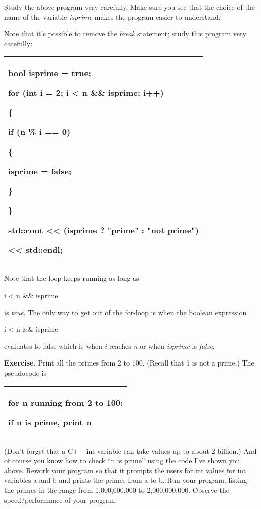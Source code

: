 \documentclass[
]{article}
\begin{document}
Study the above program very carefully. Make sure you see that the
choice of the name of the variable \emph{isprime} makes the program
easier to understand.

Note that it's possible to remove the \emph{break} statement; study this
program very carefully:

\begin{longtable}[]{@{}l@{}}
\toprule
\endhead
\begin{minipage}[t]{0.97\columnwidth}\raggedright
bool isprime = true;

for (int i = 2; i \textless{} n \&\& isprime; i++)

\{

if (n \% i == 0)

\{

isprime = false;

\}

\}

std::cout \textless\textless{} (isprime ? "prime" : "not prime")

\textless\textless{} std::endl;\strut
\end{minipage}\tabularnewline
\bottomrule
\end{longtable}

Note that the loop keeps running as long as

i \textless{} n \&\& isprime

is \emph{true}. The only way to get out of the for-loop is when the
boolean expression

i \textless{} n \&\& isprime

evaluates to false which is when \emph{i} reaches \emph{n} or when
\emph{isprime} is \emph{false}.

\textbf{Exercise.} Print all the primes from 2 to 100. (Recall that 1 is
not a prime.) The pseudocode is

\begin{longtable}[]{@{}l@{}}
\toprule
\endhead
\begin{minipage}[t]{0.97\columnwidth}\raggedright
for n running from 2 to 100:

if n is prime, print n \strut
\end{minipage}\tabularnewline
\bottomrule
\end{longtable}

(Don't forget that a C++ int variable can take values up to about 2
billion.) And of course you know how to check ``n is prime'' using the
code I've shown you above. Rework your program so that it prompts the
users for int values for int variables a and b and prints the primes
from a to b. Run your program, listing the primes in the range from
1,000,000,000 to 2,000,000,000. Observe the speed/performance of your
program.
\end{document}
